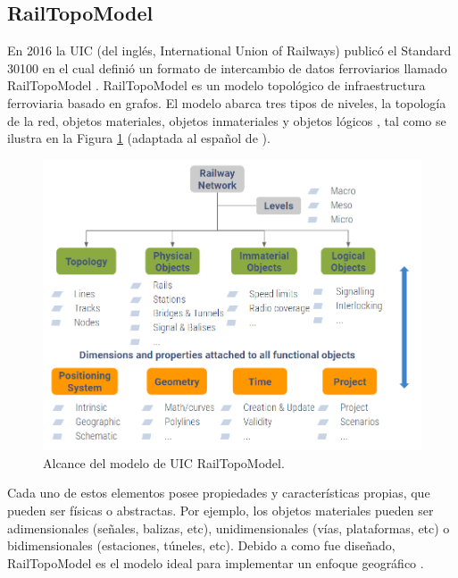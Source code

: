 \subsection{RailTopoModel}

    En 2016 la UIC (del inglés, International Union of Railways) publicó el Standard 30100 \cite{Paper_109} en el cual definió un formato de intercambio de datos ferroviarios llamado RailTopoModel \cite{Paper_146,Paper_149,Paper_150,Paper_200}. RailTopoModel es un modelo topológico de infraestructura ferroviaria basado en grafos. El modelo abarca tres tipos de niveles, la topología de la red, objetos materiales, objetos inmateriales y objetos lógicos \cite{Paper_109}, tal como se ilustra en la Figura \ref{fig:RTM_3} (adaptada al español de \cite{Paper_109}). 

    \begin{figure}[!h]
        \centering
        \includegraphics[width=1\textwidth]{Figuras/objetos}
        \centering\caption{Alcance del modelo de UIC RailTopoModel.}
        \label{fig:RTM_3}
    \end{figure}

    Cada uno de estos elementos posee propiedades y características propias, que pueden ser físicas o abstractas. Por ejemplo, los objetos materiales pueden ser adimensionales (señales, balizas, etc), unidimensionales (vías, plataformas, etc) o bidimensionales (estaciones, túneles, etc). Debido a como fue diseñado, RailTopoModel es el modelo ideal para implementar un enfoque geográfico \cite{Paper_146,Paper_149,Paper_180,Paper_182,Paper_99,Paper_107}.
    




